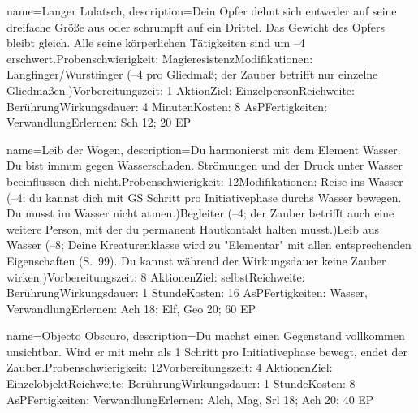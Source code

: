 {
    name={Langer Lulatsch},
    description={Dein Opfer dehnt sich entweder auf seine dreifache Größe aus oder schrumpft auf ein Drittel. Das Gewicht des Opfers bleibt gleich. Alle seine körperlichen Tätigkeiten sind um –4 erschwert.\newline Probenschwierigkeit: Magieresistenz\newline Modifikationen: Langfinger/Wurstfinger (–4 pro Gliedmaß; der Zauber betrifft nur einzelne Gliedmaßen.)\newline Vorbereitungszeit: 1 Aktion\newline Ziel: Einzelperson\newline Reichweite: Berührung\newline Wirkungsdauer: 4 Minuten\newline Kosten: 8 AsP\newline Fertigkeiten: Verwandlung\newline Erlernen: Sch 12; 20 EP}
}


{
    name={Leib der Wogen},
    description={Du harmonierst mit dem Element Wasser. Du bist immun gegen Wasserschaden. Strömungen und der Druck unter Wasser beeinflussen dich nicht.\newline Probenschwierigkeit: 12\newline Modifikationen: Reise ins Wasser (–4; du kannst dich mit GS Schritt pro Initiativephase durchs Wasser bewegen. Du musst im Wasser nicht atmen.)\newline Begleiter (–4; der Zauber betrifft auch eine weitere Person, mit der du permanent Hautkontakt halten musst.)\newline Leib aus Wasser (–8; Deine Kreaturenklasse wird zu "Elementar" mit allen entsprechenden Eigenschaften (S. 99). Du kannst während der Wirkungsdauer keine Zauber wirken.)\newline Vorbereitungszeit: 8 Aktionen\newline Ziel: selbst\newline Reichweite: Berührung\newline Wirkungsdauer: 1 Stunde\newline Kosten: 16 AsP\newline Fertigkeiten: Wasser, Verwandlung\newline Erlernen: Ach 18; Elf, Geo 20; 60 EP}
}


{
    name={Objecto Obscuro},
    description={Du machst einen Gegenstand vollkommen unsichtbar. Wird er mit mehr als 1 Schritt pro Initiativephase bewegt, endet der Zauber.\newline Probenschwierigkeit: 12\newline Vorbereitungszeit: 4 Aktionen\newline Ziel: Einzelobjekt\newline Reichweite: Berührung\newline Wirkungsdauer: 1 Stunde\newline Kosten: 8 AsP\newline Fertigkeiten: Verwandlung\newline Erlernen: Alch, Mag, Srl 18; Ach 20; 40 EP}
}


